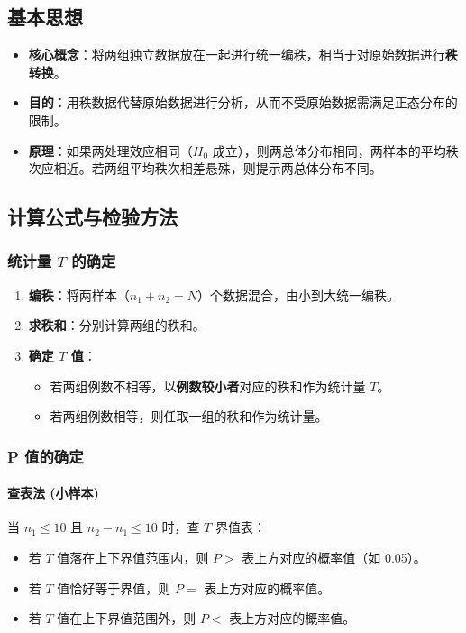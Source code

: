 \documentclass[lang=cn,10pt]{elegantbook}
\begin{document}
\subsection{基本思想}
\begin{itemize}
    \item \textbf{核心概念}：将两组独立数据放在一起进行统一编秩，相当于对原始数据进行\textbf{秩转换}。
    \item \textbf{目的}：用秩数据代替原始数据进行分析，从而不受原始数据需满足正态分布的限制。
    \item \textbf{原理}：如果两处理效应相同（$H_0$ 成立），则两总体分布相同，两样本的平均秩次应相近。若两组平均秩次相差悬殊，则提示两总体分布不同。
\end{itemize}

\subsection{计算公式与检验方法}

\subsubsection{统计量 $T$ 的确定}
\begin{enumerate}
    \item \textbf{编秩}：将两样本（$n_1 + n_2 = N$）个数据混合，由小到大统一编秩。
    \item \textbf{求秩和}：分别计算两组的秩和。
    \item \textbf{确定 $T$ 值}：
    \begin{itemize}
        \item 若两组例数不相等，以\textbf{例数较小者}对应的秩和作为统计量 $T$。
        \item 若两组例数相等，则任取一组的秩和作为统计量。
    \end{itemize}
\end{enumerate}

\subsubsection{P 值的确定}
\paragraph{查表法 (小样本)}
当 $n_1 \le 10$ 且 $n_2 - n_1 \le 10$ 时，查 $T$ 界值表：
\begin{itemize}
    \item 若 $T$ 值落在上下界值范围内，则 $P >$ 表上方对应的概率值（如 0.05）。
    \item 若 $T$ 值恰好等于界值，则 $P =$ 表上方对应的概率值。
    \item 若 $T$ 值在上下界值范围外，则 $P <$ 表上方对应的概率值。
\end{itemize}
\end{document}
